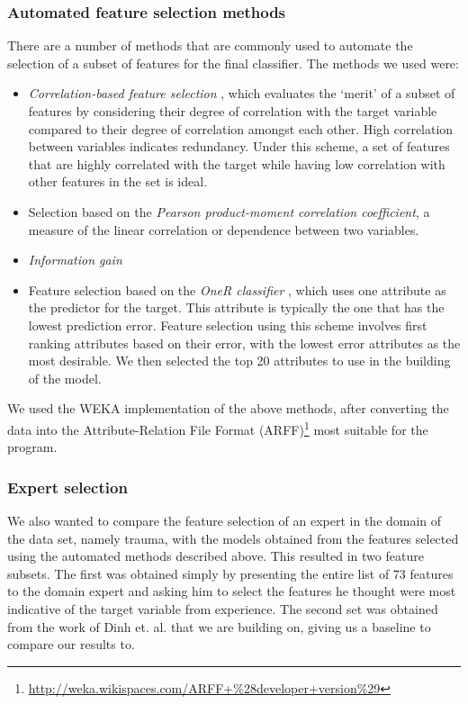 \subsubsection{Automated feature selection methods}
There are a number of methods that are commonly used to automate the selection
of a subset of features for the final classifier. The methods we used were:
\begin{itemize}
\item \textit{Correlation-based feature selection} \citep{Hall2000},
which evaluates the `merit' of a
subset of features by considering their degree of correlation with the target
variable compared to their degree of correlation amongst each other. High
correlation between variables indicates redundancy. Under
this scheme, a set of features that are highly correlated with the target
while having low correlation with other features in the set is ideal.
\item Selection based on the
\textit{Pearson product-moment correlation coefficient}, a measure of the
linear correlation or dependence between two variables.
\item \textit{Information gain} 
\item Feature selection based on the \textit{OneR classifier}
\citep{Holte1993}, which uses one
attribute as the predictor for the target. This attribute is typically the one
that has the lowest prediction error. Feature selection using this scheme
involves first ranking attributes based on their error, with the lowest error
attributes as the most desirable. We then selected the top 20 attributes to
use in the building of the model.
\end{itemize}

We used the WEKA \citep{Hall2009} implementation of the above methods, after
converting the data into the Attribute-Relation File Format
(ARFF)\footnote{\url{http://weka.wikispaces.com/ARFF+\%28developer+version\%29}}
most suitable for the program.

\subsubsection{Expert selection}
We also wanted to compare the feature selection of an expert in the domain
of the data set, namely trauma, with the models obtained from the features
selected using the automated methods described above. This resulted in two
feature subsets. The first was obtained simply by presenting the entire list
of 73 features to the domain expert and asking him to select the features he
thought were most indicative of the target variable from experience. The
second set was obtained from the work of Dinh et. al. \citep{Dinh2013a} that
we are building on, giving us a baseline to compare our results to.

